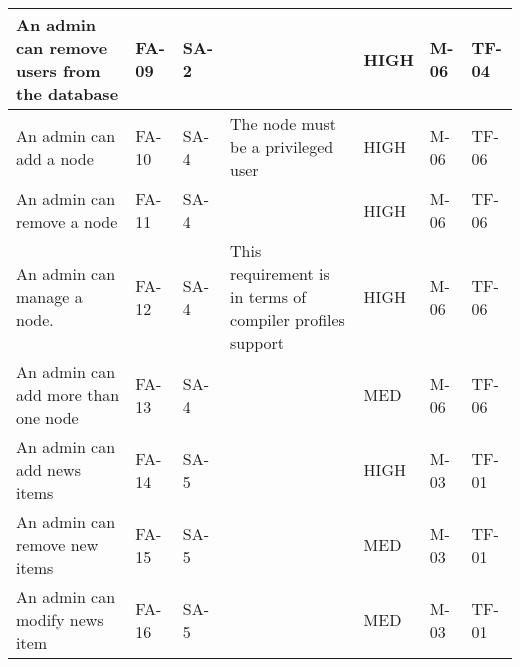 \begin{supertabular}{|p{2cm}|l|m{0.33795986in}|m{1.2684599in}|m{0.5254598in}|m{1.0983598in}|m{1.0566599in}|}
An admin can remove users from the database & FA-09 & SA-2 && HIGH & M-06 & TF-04\\ 
\hline

An admin can add a node & FA-10 & SA-4 & The node must be a privileged
user & HIGH & M-06 & TF-06\\ 
\hline 

An admin can remove a node & FA-11 & SA-4 & & HIGH & M-06 & TF-06\\ 
\hline 

An admin can manage a node. & FA-12 & SA-4 & This requirement is in terms of
compiler profiles support & HIGH & M-06 & TF-06\\ 
\hline 

An admin can add more than one node & FA-13 & SA-4 & & MED & M-06 & TF-06\\ 
\hline 

An admin can add news items & FA-14 & SA-5 & & HIGH & M-03 & TF-01\\ 
\hline

An admin can remove new items & FA-15 & SA-5 & & MED & M-03 & TF-01\\ 
\hline 

An admin can modify news item & FA-16 & SA-5 & & MED & M-03 & TF-01\\ 
\hline 
\end{supertabular}

